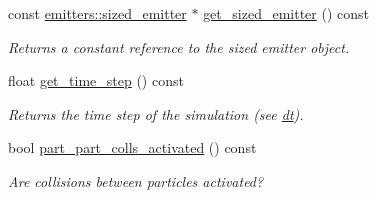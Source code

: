 \begin{DoxyCompactItemize}
\mbox{\label{classphysim_1_1simulator_af2d5db9f6b27dfc7ff090d97e90d9445}} 
const \hyperlink{classphysim_1_1emitters_1_1sized__emitter}{emitters\+::sized\+\_\+emitter} $\ast$ \hyperlink{classphysim_1_1simulator_af2d5db9f6b27dfc7ff090d97e90d9445}{get\+\_\+sized\+\_\+emitter} () const
\begin{DoxyCompactList}\small\item\em Returns a constant reference to the sized emitter object. \end{DoxyCompactList}\item 
\mbox{\label{classphysim_1_1simulator_a37d5c3adc5e003ab046cc3624e12b6fb}} 
float \hyperlink{classphysim_1_1simulator_a37d5c3adc5e003ab046cc3624e12b6fb}{get\+\_\+time\+\_\+step} () const
\begin{DoxyCompactList}\small\item\em Returns the time step of the simulation (see \hyperlink{classphysim_1_1simulator_a12a60d0ed819937b51ce50162dbdd6e1}{dt}). \end{DoxyCompactList}\item 
bool \hyperlink{classphysim_1_1simulator_ab36133b4fa2b4fb2d8f297f6a7dda497}{part\+\_\+part\+\_\+colls\+\_\+activated} () const
\begin{DoxyCompactList}\small\item\em Are collisions between particles activated? \end{DoxyCompactList}\end{DoxyCompactItemize}
